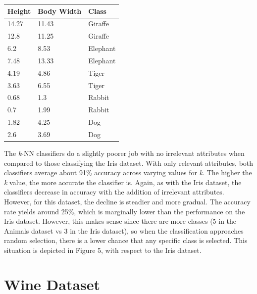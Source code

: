 \documentclass{article}
\begin{document}
\begin{center}
\begin{tabular}{ | l | l | l | }
\hline
\textbf{Height} & \textbf{Body Width} & \textbf{Class} \\ 
\hline
\hline
14.27 & 11.43 & Giraffe \\ \hline
12.8 & 11.25 & Giraffe \\ \hline
6.2 & 8.53 & Elephant \\ \hline
7.48 & 13.33 & Elephant \\ \hline
4.19 & 4.86 & Tiger \\ \hline
3.63 & 6.55 & Tiger \\ \hline
0.68 & 1.3 & Rabbit \\ \hline 
0.7 & 1.99 & Rabbit \\ \hline
1.82 & 4.25 & Dog \\ \hline
2.6 & 3.69 & Dog \\ \hline

\end{tabular}
\end{center}

The \textit{k}-NN classifiers do a slightly poorer job with no irrelevant attributes when compared to those classifying the Iris dataset. With only relevant attributes, both classifiers average about 91\% accuracy across varying values for \textit{k}. The higher the \textit{k} value, the more accurate the classifier is. Again, as with the Iris dataset, the classifiers decrease in accuracy with the addition of irrelevant attributes. However, for this dataset, the decline is steadier and more gradual. The accuracy rate yields around 25\%, which is marginally lower than the performance on the Iris dataset. However, this makes sense since there are more classes (5 in the Animals dataset vs 3 in the Iris dataset), so when the classification approaches random selection, there is a lower chance that any specific class is selected. This situation is depicted in Figure 5, with respect to the Iris dataset.  

\section{Wine Dataset}
\end{document}
